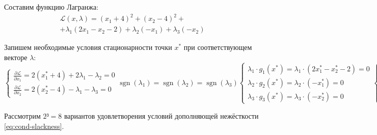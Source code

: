\documentclass{article}
\renewcommand{\leq}{\leqslant}
\newcommand{\La}{\mathcal{L}}
\newcommand{\pardiff}[2]{\frac{\partial{#1}}{\partial{#2}}}
\newcommand{\mul}{\cdot}
\DeclareMathOperator{\sgn}{sgn}
\theoremstyle{remark}
\theoremstyle{definition}
\numberwithin{equation}{section}
\begin{document}
Составим функцию Лагранжа:
\begin{multline}
  \label{eq:lagrange}
  \La(x, \lambda) = (x_1+4)^2 + (x_2-4)^2 +\\
  + \lambda_1(2x_1-x_2-2)+\lambda_2(-x_1)+\lambda_3(-x_2)
\end{multline}

Запишем необходимые условия стационарности точки $x^*$ при
соответствующем векторе $\lambda$:
\begin{subequations}
  \renewcommand{\theequation}{\theparentequation\asbuk{equation}}
  \label{eq:kkt-conditions}
  \begin{equation}
    \label{eq:cond-stationary}
    \begin{cases}
      \pardiff{\La}{x_1} = 2(x^*_1+4)+2\lambda_1-\lambda_2=0\\
      \pardiff{\La}{x_2} = 2(x^*_2-4)-\lambda_1-\lambda_3=0
    \end{cases}
  \end{equation}
  \begin{equation}
    \label{eq:cond-sign}
    \sgn(\lambda_1) = \sgn(\lambda_2) = \sgn(\lambda_3)
  \end{equation}
  \begin{equation}
    \label{eq:cond-slackness}
    \begin{cases}
      \lambda_1\mul g_1(x^*) = \lambda_1\mul (2x^*_1-x^*_2-2) = 0\\
      \lambda_2\mul g_2(x^*) = \lambda_2\mul (-x^*_1) = 0\\
      \lambda_3\mul g_3(x^*) = \lambda_3\mul (-x^*_2) = 0
    \end{cases}
  \end{equation}
  \begin{equation}
    \begin{cases}
      \label{eq:cond-feasible}
      g_1(x^*) = 2x^*_1 - x^*_2 - 2 \leq 0 \\
      g_2(x^*) = -x^*_1 \leq 0 \\
      g_3(x^*) = -x^*_2 \leq 0
    \end{cases}
  \end{equation}
\end{subequations}

Рассмотрим $2³=8$ вариантов удовлетворения условий дополняющей
нежёсткости \eqref{eq:cond-slackness}.
\end{document}
